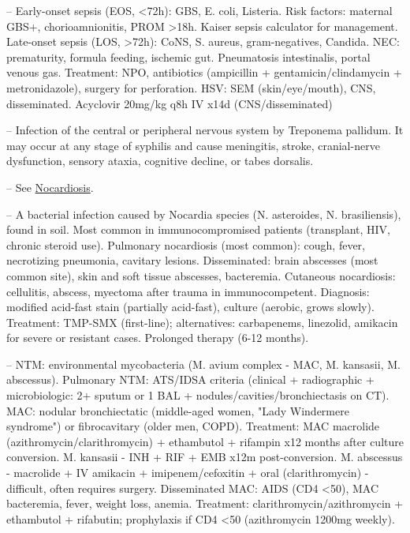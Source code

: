 -- Early-onset sepsis (EOS, <72h): GBS, E. coli, Listeria. Risk factors: maternal GBS+, chorioamnionitis, PROM >18h. Kaiser sepsis calculator for management. Late-onset sepsis (LOS, >72h): CoNS, S. aureus, gram-negatives, Candida. NEC: prematurity, formula feeding, ischemic gut. Pneumatosis intestinalis, portal venous gas. Treatment: NPO, antibiotics (ampicillin + gentamicin/clindamycin + metronidazole), surgery for perforation. HSV: SEM (skin/eye/mouth), CNS, disseminated. Acyclovir 20mg/kg q8h IV x14d (CNS/disseminated)

-- Infection of the central or peripheral nervous system by Treponema pallidum. It may occur at any stage of syphilis and cause meningitis, stroke, cranial-nerve dysfunction, sensory ataxia, cognitive decline, or tabes dorsalis.

-- See \hyperlink{Nocardiosis}{Nocardiosis}.

-- A bacterial infection caused by Nocardia species (N. asteroides, N. brasiliensis), found in soil. Most common in immunocompromised patients (transplant, HIV, chronic steroid use). Pulmonary nocardiosis (most common): cough, fever, necrotizing pneumonia, cavitary lesions. Disseminated: brain abscesses (most common site), skin and soft tissue abscesses, bacteremia. Cutaneous nocardiosis: cellulitis, abscess, myectoma after trauma in immunocompetent. Diagnosis: modified acid-fast stain (partially acid-fast), culture (aerobic, grows slowly). Treatment: TMP-SMX (first-line); alternatives: carbapenems, linezolid, amikacin for severe or resistant cases. Prolonged therapy (6-12 months).

-- NTM: environmental mycobacteria (M. avium complex - MAC, M. kansasii, M. abscessus). Pulmonary NTM: ATS/IDSA criteria (clinical + radiographic + microbiologic: 2+ sputum or 1 BAL + nodules/cavities/bronchiectasis on CT). MAC: nodular bronchiectatic (middle-aged women, "Lady Windermere syndrome") or fibrocavitary (older men, COPD). Treatment: MAC macrolide (azithromycin/clarithromycin) + ethambutol + rifampin x12 months after culture conversion. M. kansasii - INH + RIF + EMB x12m post-conversion. M. abscessus - macrolide + IV amikacin + imipenem/cefoxitin + oral (clarithromycin) - difficult, often requires surgery. Disseminated MAC: AIDS (CD4 <50), MAC bacteremia, fever, weight loss, anemia. Treatment: clarithromycin/azithromycin + ethambutol + rifabutin; prophylaxis if CD4 <50 (azithromycin 1200mg weekly).

